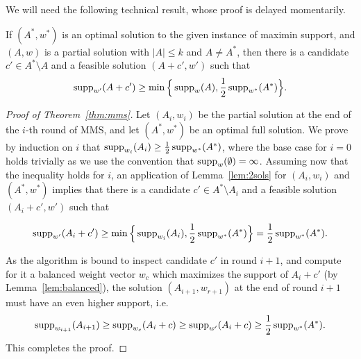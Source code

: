 We will need the following technical result, whose proof is delayed momentarily. 

\begin{lemma}\label{lem:2sols}
If $(A^*, w^*)$ is an optimal solution to the given instance of maximin support, and $(A,w)$ is a partial solution with $|A|\leq k$ and $A\neq A^*$, then there is a candidate $c'\in A^*\setminus A$ and a feasible solution $(A+c', w')$ such that 
$$\operatorname{supp}_{w'}(A+c')\geq \min\Big\{\operatorname{supp}_w(A), \frac{1}{2} \operatorname{supp}_{w^*}(A^*)\Big\}.$$
\end{lemma}


\begin{proof}[Proof of Theorem~\ref{thm:mms}]
Let $(A_i, w_i)$ be the partial solution at the end of the $i$-th round of MMS, and let $(A^*, w^*)$ be an optimal full solution. We prove by induction on $i$ that $\operatorname{supp}_{w_i}(A_i)\geq \frac{1}{2}\operatorname{supp}_{w^*}(A^*)$, where the base case for $i=0$ holds trivially as we use the convention that $\operatorname{supp}_w(\emptyset)=\infty$.
Assuming now that the inequality holds for $i$, an application of Lemma~\ref{lem:2sols} for $(A_i, w_i)$ and $(A^*, w^*)$ implies that there is a candidate $c'\in A^*\setminus A_i$ and a feasible solution $(A_i+c', w')$ such that 

$$\operatorname{supp}_{w'}(A_i+c')\geq \min\Big\{\operatorname{supp}_{w_i}(A_i), \frac{1}{2} \operatorname{supp}_{w^*}(A^*)\Big\} = \frac{1}{2} \operatorname{supp}_{w^*}(A^*).$$

As the algorithm is bound to inspect candidate $c'$ in round $i+1$, and compute for it a balanced weight vector $w_c$ which maximizes the support of $A_i+c'$ (by Lemma~\ref{lem:balanced}), the solution $(A_{i+1}, w_{r+1})$ at the end of round $i+1$ must have an even higher support, i.e. %
%
$$\operatorname{supp}_{w_{i+1}}(A_{i+1})\geq \operatorname{supp}_{w_c}(A_i+c) 
\geq \operatorname{supp}_{w'}(A_i+c) \geq \frac{1}{2} \operatorname{supp}_{w^*}(A^*).$$
%
This completes the proof.
\end{proof}

